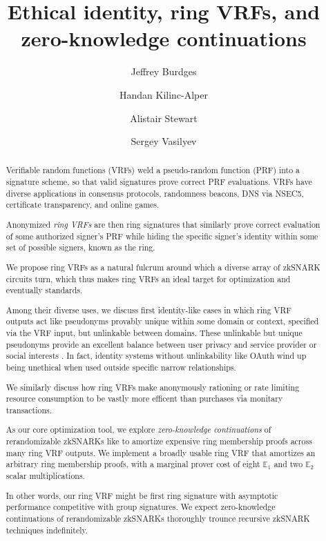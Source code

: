 \documentclass[runningheads,evcountsame,a4paper,11pt,orivec]{llncs}
\title{Ethical identity, ring VRFs, and zero-knowledge continuations}
\author{Jeffrey Burdges \and Handan Kilinc-Alper \and Alistair Stewart \and Sergey Vasilyev}
\date{}
\begin{document}
	
\maketitle

\begin{abstract}
Verifiable random functions (VRFs) weld a pseudo-random function (PRF) into
a signature scheme, so that valid signatures prove correct PRF evaluations.
VRFs have diverse applications in consensus protocols, randomness
beacons, DNS via NSEC5, certificate transparency, and online games.

\smallskip

Anonymized {\em ring VRFs} are then ring signatures that similarly prove
correct evaluation of some authorized signer's PRF while hiding the
specific signer's identity within some set of possible signers,
 known as the ring.


\smallskip %

We propose ring VRFs as a natural fulcrum around which a diverse array of
zkSNARK circuits turn, which thus makes ring VRFs an ideal target
for optimization and eventually standards. 

\smallskip

Among their diverse uses, we discuss first identity-like cases in which
ring VRF outputs act like pseudonyms provably unique within some domain or
context, specified via the VRF input, but unlinkable between domains. 
These unlinkable but unique pseudonyms provide an excellent balance between
user privacy and service provider or social interests \cite{pop2008}.
%
In fact, identity systems without unlinkability like OAuth wind up being
unethical when used outside specific narrow relationships.

\smallskip

We similarly discuss how ring VRFs make anonymously rationing or
rate limiting resource consumption to be vastly more efficent than
purchases via monitary transactions.

\smallskip %

As our core optimization tool, we explore {\em zero-knowledge continuations}
of rerandomizable zkSNARKs like \cite{Groth16} to amortize expensive
ring membership proofs across many ring VRF outputs. 
%
We implement a broadly usable ring VRF that amortizes an arbitrary
ring membership proofs, with a marginal prover cost
 of eight $\mathbb{E}_1$ and two $\mathbb{E}_2$ scalar multiplications.

\smallskip

In other words, our ring VRF might be first ring signature with asymptotic
performance competitive with group signatures.
%
We expect zero-knowledge continuations of rerandomizable zkSNARKs
thoroughly trounce recursive zkSNARK techniques indefinitely.
\end{abstract}
\end{document}
